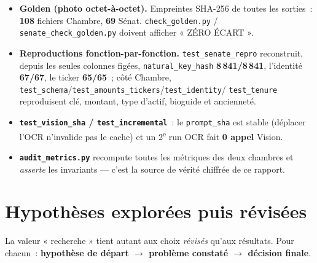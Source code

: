 \documentclass[11pt,a4paper]{article}
\newcommand{\co}[1]{\texttt{\small #1}}
\begin{document}
\begin{itemize}[nosep,leftmargin=1.5em]
\item \textbf{Golden (photo octet-à-octet).} Empreintes SHA-256 de toutes les sorties~: \textbf{108}
fichiers Chambre, \textbf{69} Sénat. \co{check_golden.py} / \co{senate_check_golden.py} doivent afficher
« ZÉRO ÉCART ».
\item \textbf{Reproductions fonction-par-fonction.} \co{test_senate_repro} reconstruit, depuis les
seules colonnes figées, \co{natural_key_hash} \textbf{8\,841/8\,841}, l'identité \textbf{67/67}, le
ticker \textbf{65/65}~; côté Chambre, \co{test_schema}/\co{test_amounts_tickers}/\co{test_identity}/
\co{test_tenure} reproduisent clé, montant, type d'actif, bioguide et ancienneté.
\item \textbf{\co{test_vision_sha} / \co{test_incremental}}~: le \co{prompt_sha} est stable (déplacer
l'OCR n'invalide pas le cache) et un 2\textsuperscript{e} run OCR fait \textbf{0 appel} Vision.
\item \textbf{\co{audit_metrics.py}} recompute toutes les métriques des deux chambres et \emph{asserte}
les invariants — c'est la source de vérité chiffrée de ce rapport.
\end{itemize}

\section{Hypothèses explorées puis révisées}
\label{sec:hypotheses}

La valeur « recherche » tient autant aux choix \emph{révisés} qu'aux résultats. Pour chacun~:
\textbf{hypothèse de départ $\rightarrow$ problème constaté $\rightarrow$ décision finale}.
\end{document}
